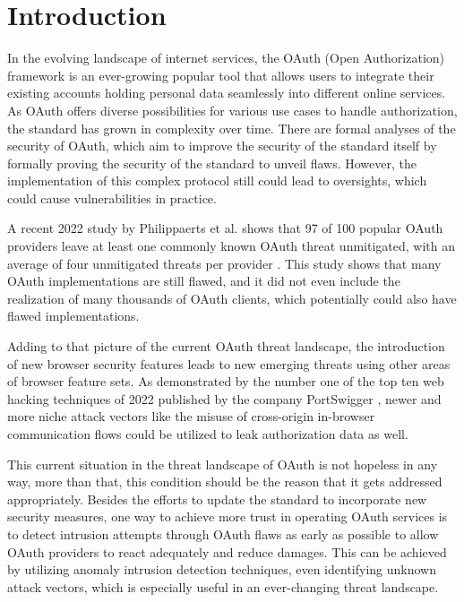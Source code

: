 \documentclass[
    fontsize=12pt,
    headings=small,
    parskip=half,           %
    bibliography=totoc,
    numbers=noenddot,       %
    open=any,               %
    ]{scrreprt}
\begin{document}
\chapter{Introduction}
\label{chap:introduction}
In the evolving landscape of internet services, the OAuth (Open Authorization) framework is an ever-growing popular tool that allows users to integrate their existing accounts holding personal data seamlessly into different online services. As OAuth offers diverse possibilities for various use cases to handle authorization, the standard has grown in complexity over time. There are formal analyses of the security of OAuth, which aim to improve the security of the standard itself \cite{fett2016comprehensive} by formally proving the security of the standard to unveil flaws. However, the implementation of this complex protocol still could lead to oversights, which could cause vulnerabilities in practice.

A recent 2022 study by Philippaerts et al. shows that 97 of 100 popular OAuth providers leave at least one commonly known OAuth threat unmitigated, with an average of four unmitigated threats per provider \cite{philippaerts2022oauch}. This study shows that many OAuth implementations are still flawed, and it did not even include the realization of many thousands of OAuth clients, which potentially could also have flawed implementations. 

Adding to that picture of the current OAuth threat landscape, the introduction of new browser security features leads to new emerging threats using other areas of browser feature sets. As demonstrated by the number one of the top ten web hacking techniques of 2022 published by the company PortSwigger \cite{kettle2022}, newer and more niche attack vectors like the misuse of cross-origin in-browser communication flows could be utilized to leak authorization data as well.

This current situation in the threat landscape of OAuth is not hopeless in any way, more than that, this condition should be the reason that it gets addressed appropriately. Besides the efforts to update the standard to incorporate new security measures, one way to achieve more trust in operating OAuth services is to detect intrusion attempts through OAuth flaws as early as possible to allow OAuth providers to react adequately and reduce damages. This can be achieved by utilizing anomaly intrusion detection techniques, even identifying unknown attack vectors, which is especially useful in an ever-changing threat landscape.
\end{document}
